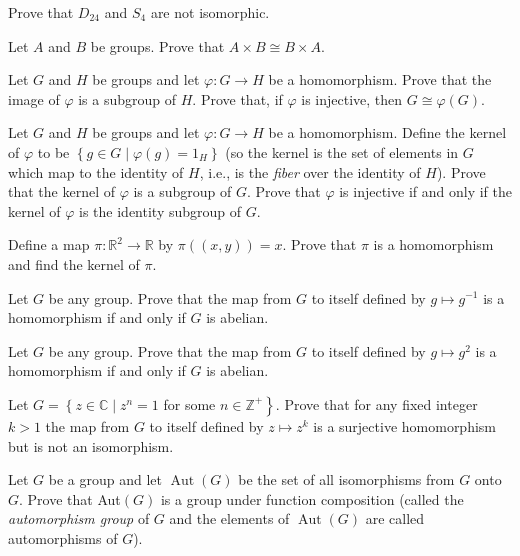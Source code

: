\documentclass[
    11pt,a4paper,
]{exam}
\begin{document}
\begin{questions}
    \question
    Prove that \(D_{24}\) and \(S_4\) are not isomorphic.
    
    
    
    \question
    Let \(A\) and \(B\) be groups. Prove that \(A \times B \cong B \times A\).
    
    
    \question
    Let \(G\) and \(H\) be groups and let \(\varphi: G \rightarrow H\) be a homomorphism. 
    Prove that the image of \(\varphi\)  is a subgroup of \(H\).
    Prove that, if \(\varphi\) is injective, then \(G \cong \varphi(G)\).
    
    
    \question
    Let \(G\) and \(H\) be groups and let \(\varphi: G \rightarrow H\) be a homomorphism. Define the kernel of \(\varphi\) to be \(\left\{g \in G \mid \varphi(g)=1_H\right\}\) (so the kernel is the set of elements in \(G\) which map to the identity of \(H\), i.e., is the \textit{fiber} over the identity of \(H\)). Prove that the kernel of \(\varphi\) is a subgroup   of \(G\). Prove that \(\varphi\) is injective if and only if the kernel of \(\varphi\) is the identity subgroup of \(G\).
    
    \question
    Define a map \(\pi: \mathbb{R}^2 \rightarrow \mathbb{R}\) by \(\pi((x, y))=x\). Prove that \(\pi\) is a homomorphism and find the kernel of \(\pi\).
    
    \question
    Let \(G\) be any group. Prove that the map from \(G\) to itself defined by \(g \mapsto g^{-1}\) is a homomorphism if and only if \(G\) is abelian.
    
    
    \question
    Let \(G\) be any group. Prove that the map from \(G\) to itself defined by \(g \mapsto g^2\) is a homomorphism if and only if \(G\) is abelian.
    
    \question
    Let \(G=\left\{z \in \mathbb{C} \mid z^n=1\right.\) for some \(\left.n \in \mathbb{Z}^{+}\right\}\). Prove that for any fixed integer \(k>1\) the map from \(G\) to itself defined by \(z \mapsto z^k\) is a surjective homomorphism but is not an isomorphism.
    
    
    
    
    \question
    Let \(G\) be a group and let \(\operatorname{Aut}(G)\) be the set of all isomorphisms from \(G\) onto \(G\). Prove that Aut\((G)\) is a group under function composition (called the \textit{automorphism group} of \(G\) and the elements of \(\operatorname{Aut}(G)\) are called automorphisms of \(G\)).
    
    
    
    
    

\end{questions}
\end{document}
